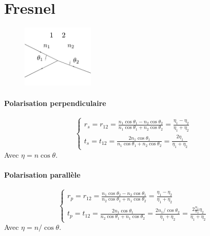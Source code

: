 \documentclass[a4paper,english]{article}
\begin{document}
\section{Fresnel}


\begin{figure}[H]
	\centering
	\includegraphics[height=3cm]{Figures/fresnel.pdf}
\end{figure}

\paragraph{Polarisation perpendiculaire}
\begin{equation}
\left\{ \begin{array}{l}
r_s = r_{12} = \frac{n_1 \cos \theta_1 - n_2 \cos \theta_2}{n_1 \cos \theta_1 + n_2 \cos \theta_2} = \frac{\eta_1 - \eta_2}{\eta_1 + \eta_2} \\
t_s = t_{12} = \frac{2 n_1 \cos \theta_1}{n_1 \cos \theta_1 + n_2 \cos \theta_2} = \frac{2 \eta_1}{\eta_1 + \eta_2}
\end{array} \right.
\end{equation}
Avec $\eta = n \cos \theta$.

\paragraph{Polarisation parallèle}
\begin{equation}
\left\{ \begin{array}{l}
r_p = r_{12} = \frac{n_1 \cos \theta_2 - n_2 \cos \theta_1}{n_2 \cos \theta_1 + n_1 \cos \theta_2} = \frac{\eta_1 - \eta_2}{\eta_1 + \eta_2} \\
t_p = t_{12} = \frac{2 n_1 \cos \theta_1}{n_2 \cos \theta_1 + n_1 \cos \theta_2} = \frac{2 n_1 / \cos \theta_2}{\eta_1 + \eta_2} = \frac{2 \frac{n_1}{n_2} \eta_2}{\eta_1 + \eta_2}
\end{array} \right.
\end{equation}
Avec $\eta = n / \cos \theta$.
\end{document}
